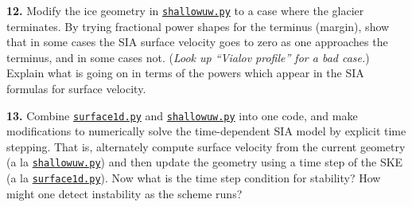 \documentclass[12pt]{amsart}
\newcommand{\prob}[1]{\bigskip\noindent\textbf{#1.}\quad }
\begin{document}
\prob{12}  Modify the ice geometry in \href{https://github.com/bueler/mccarthy/blob/master/py/shallowuw.py}{\texttt{shallowuw.py}} to a case where the glacier terminates.  By trying fractional power shapes for the terminus (margin), show that in some cases the SIA surface velocity goes to zero as one approaches the terminus, and in some cases not.  (\emph{Look up ``Vialov profile'' for a bad case.})  Explain what is going on in terms of the powers which appear in the SIA formulas for surface velocity.

\prob{13}  Combine \href{https://github.com/bueler/mccarthy/blob/master/py/surface1d.py}{\texttt{surface1d.py}} and \href{https://github.com/bueler/mccarthy/blob/master/py/shallowuw.py}{\texttt{shallowuw.py}} into one code, and make modifications to numerically solve the time-dependent SIA model by explicit time stepping.  That is, alternately compute surface velocity from the current geometry (a la \href{https://github.com/bueler/mccarthy/blob/master/py/shallowuw.py}{\texttt{shallowuw.py}}) and then update the geometry using a time step of the SKE (a la \href{https://github.com/bueler/mccarthy/blob/master/py/surface1d.py}{\texttt{surface1d.py}}).  Now what is the time step condition for stability?  How might one detect instability as the scheme runs?
\end{document}

